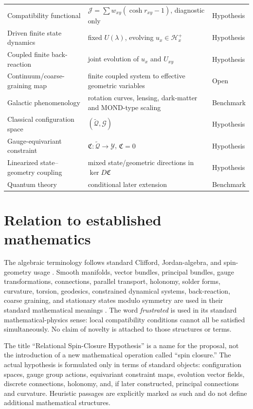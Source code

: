 \documentclass[11pt,a4paper]{article}
\theoremstyle{remark}
\newcommand{\tQ}{\widetilde{\mathcal Q}}
\newcommand{\cG}{\mathcal G}
\newcommand{\cY}{\mathcal Y}
\newcommand{\statusHypothesis}{\textsf{Hypothesis}}
\newcommand{\statusOpen}{\textsf{Open}}
\newcommand{\statusBenchmark}{\textsf{Benchmark}}
\begin{document}
\begin{longtable}{@{}L{0.26\textwidth}L{0.47\textwidth}L{0.13\textwidth}@{}}
Compatibility functional & \(\mathcal J=\sum w_{xy}(\cosh r_{xy}-1)\), diagnostic only & \statusHypothesis \\
Driven finite state dynamics & fixed \(U(\lambda)\), evolving \(u_x\in\mathcal H_x^+\) & \statusHypothesis \\
Coupled finite back-reaction & joint evolution of \(u_x\) and \(U_{xy}\) & \statusHypothesis \\
Continuum/coarse-graining map & finite coupled system to effective geometric variables & \statusOpen \\
Galactic phenomenology & rotation curves, lensing, dark-matter and MOND-type scaling & \statusBenchmark \\
Classical configuration space & \((\tQ,\cG)\) & \statusHypothesis \\
Gauge-equivariant constraint & \(\mathfrak C:\tQ\to\cY\), \(\mathfrak C=0\) & \statusHypothesis \\
Linearized state--geometry coupling & mixed state/geometric directions in \(\ker D\mathfrak C\) & \statusHypothesis \\
Quantum theory & conditional later extension & \statusBenchmark \\
\bottomrule
\end{longtable}
\normalsize

\section{Relation to established mathematics}

The algebraic terminology follows standard Clifford, Jordan-algebra, and spin-geometry usage \cite{Chevalley,LawsonMichelsohn}.  Smooth manifolds, vector bundles, principal bundles, gauge transformations, connections, parallel transport, holonomy, solder forms, curvature, torsion, geodesics, constrained dynamical systems, back-reaction, coarse graining, and stationary states modulo symmetry are used in their standard mathematical meanings \cite{LeeSmooth,Husemoller,KobayashiNomizu,Nakahara2003}.  The word \emph{frustrated} is used in its standard mathematical-physics sense: local compatibility conditions cannot all be satisfied simultaneously.  No claim of novelty is attached to those structures or terms.

The title ``Relational Spin-Closure Hypothesis'' is a name for the proposal, not the introduction of a new mathematical operation called ``spin closure.''  The actual hypothesis is formulated only in terms of standard objects: configuration spaces, gauge group actions, equivariant constraint maps, evolution vector fields, discrete connections, holonomy, and, if later constructed, principal connections and curvature.  Heuristic passages are explicitly marked as such and do not define additional mathematical structures.
\end{document}
